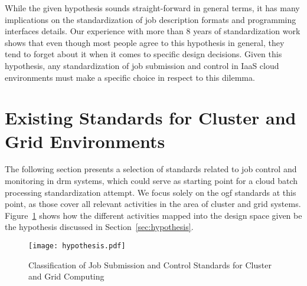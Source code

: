 \documentclass[twocolumn]{svjour3}       %
\begin{document}


While the given hypothesis sounds straight-forward in general terms, it has many implications on the standardization of job description formats and programming interfaces details. Our experience with more than 8 years of standardization work shows that even though most people agree to this hypothesis in general, they tend to forget about it when it comes to specific design decisions. Given this hypothesis, any standardization of job submission and control in IaaS cloud environments must make a specific choice in respect to this dilemma.  


\section{Existing Standards for Cluster and Grid Environments}
\label{sec:relatedwork}

The following section presents a selection of standards related to job control and monitoring in \gls{drm} systems, which could serve as starting point for a cloud batch processing standardization attempt. We focus solely on the \gls{ogf} standards at this point, as those cover all relevant activities in the area of cluster and grid systems. Figure~\ref{fig:hypothesis} shows how the different activities mapped into the design space given be the hypothesis discussed in Section~\ref{sec:hypothesis}. 

\begin{figure}
  \texttt{[image: hypothesis.pdf]}
\caption{Classification of Job Submission and Control Standards for Cluster and Grid Computing}
\label{fig:hypothesis} 
\end{figure}


% 
%
%
\end{document}
